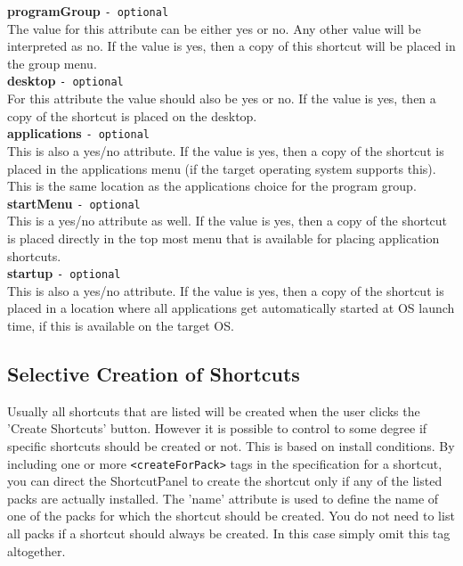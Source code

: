 \textbf{programGroup} \texttt{- optional}\\

The value for this attribute can be either yes or no. Any other value
will be interpreted as no. If the value is yes, then a copy of this
shortcut will be placed in the group menu.\\

\textbf{desktop} \texttt{- optional}\\

For this attribute the value should also be yes or no. If the value is
yes, then a copy of the shortcut is placed on the desktop.\\

\textbf{applications} \texttt{- optional}\\

This is also a yes/no attribute. If the value is yes, then a copy of the
shortcut is placed in the applications menu (if the target operating
system supports this). This is the same location as the applications
choice for the program group.\\

\textbf{startMenu} \texttt{- optional}\\

This is a yes/no attribute as well. If the value is yes, then a copy of
the shortcut is placed directly in the top most menu that is available
for placing application shortcuts.\\

\textbf{startup} \texttt{- optional}\\

This is also a yes/no attribute. If the value is yes, then a copy of the
shortcut is placed in a location where all applications get automatically
started at OS launch time, if this is available on the target OS.\\

\subsection{Selective Creation of Shortcuts}

Usually all shortcuts that are listed will be created when the user
clicks the 'Create Shortcuts' button. However it is possible to control
to some degree if specific shortcuts should be created or not. This is
based on install conditions. By including one or more \texttt{<createForPack>}
tags in the specification for a shortcut, you can direct the
ShortcutPanel to create the shortcut only if any of the listed packs are
actually installed. The 'name' attribute is used to define the name of
one of the packs for which the shortcut should be created. You do not
need to list all packs if a shortcut should always be created. In this
case simply omit this tag altogether.\\

